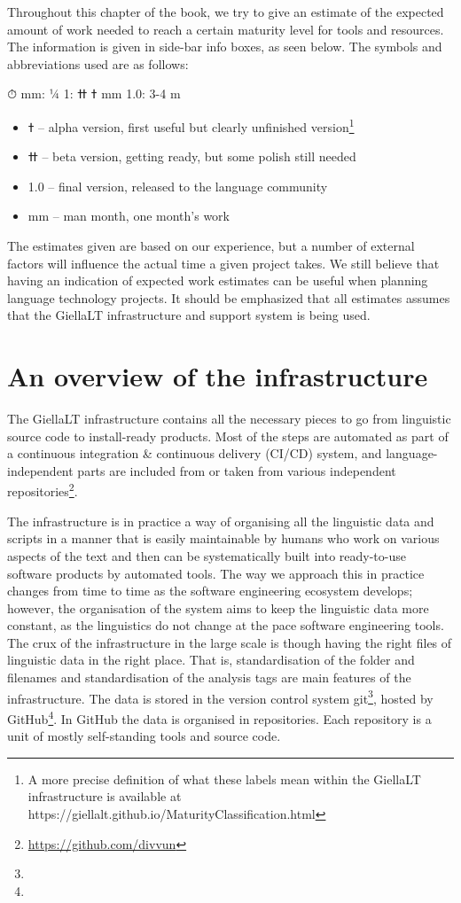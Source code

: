 \documentclass[free]{flammie}
\begin{document}
Throughout this chapter of the book, we try to give an estimate of the expected amount
of work needed to reach a certain maturity level for tools and resources. The information
is given in side-bar info boxes, as seen below. The symbols and abbreviations used are as
follows:

⏱
mm: ¼ ߙ
ߚ :1 mm
1.0: 3-4 m

\begin{itemize}
    \item ߙ – alpha version, first useful but clearly unfinished
        version\footnote{A more precise definition of what these labels mean within the GiellaLT infrastructure is available
at https://giellalt.github.io/MaturityClassification.html}
    \item ߚ – beta version, getting ready, but some polish still needed
    \item 1.0 – final version, released to the language community
    \item mm – man month, one month’s work
\end{itemize}
The estimates given are based on our experience, but a number of external factors will
influence the actual time a given project takes. We still believe that having an indication of
expected work estimates can be useful when planning language technology projects. It
should be emphasized that all estimates assumes that the GiellaLT infrastructure and support system is being used.

\section{An overview of the infrastructure}

The GiellaLT infrastructure contains all the necessary pieces to go from linguistic source
code to install-ready products. Most of the steps are automated as part of a continuous
integration \& continuous delivery (CI/CD) system, and language-independent parts
are included from or taken from various independent
repositories\footnote{\url{https://github.com/divvun}}.


The infrastructure is in practice a way of organising all the linguistic data
and scripts in a manner that is easily maintainable by humans who work on
various aspects of the text and then can be systematically built into
ready-to-use software products by automated tools. The way we approach this in
practice changes from time to time as the software engineering ecosystem
develops; however, the organisation of the system aims to keep the linguistic
data more constant, as the linguistics do not change at the pace software
engineering tools. The crux of the infrastructure in the large scale is though
having the right files of linguistic data in the right place. That is,
standardisation of the folder and filenames and standardisation of the analysis
tags are main features of the infrastructure.  The data is stored in the version
control system git\footnote{}, hosted by GitHub\footnote{}. In GitHub the data
is organised in repositories. Each repository is a unit of mostly self-standing
tools and source code.
\end{document}

